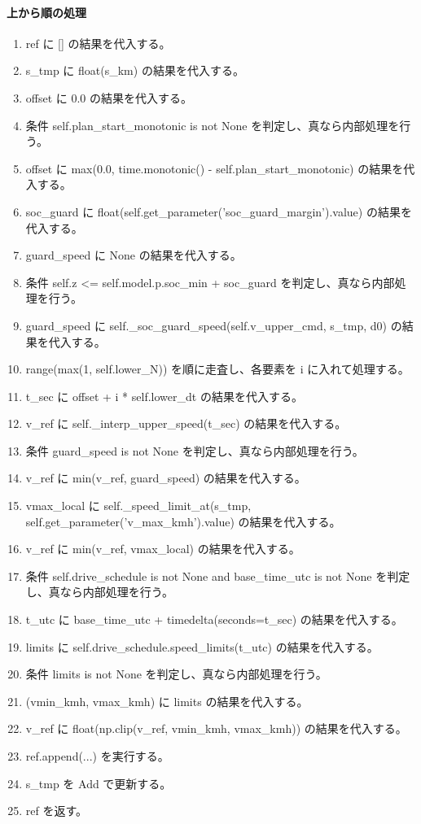 \documentclass[a4paper,11pt]{article}
\begin{document}
            \paragraph{上から順の処理}
            \begin{enumerate}[leftmargin=1.8em]
            \item ref に [] の結果を代入する。
\item s\_tmp に float(s\_km) の結果を代入する。
\item offset に 0.0 の結果を代入する。
\item 条件 self.plan\_start\_monotonic is not None を判定し、真なら内部処理を行う。
\item   offset に max(0.0, time.monotonic() - self.plan\_start\_monotonic) の結果を代入する。
\item soc\_guard に float(self.get\_parameter('soc\_guard\_margin').value) の結果を代入する。
\item guard\_speed に None の結果を代入する。
\item 条件 self.z <= self.model.p.soc\_min + soc\_guard を判定し、真なら内部処理を行う。
\item   guard\_speed に self.\_soc\_guard\_speed(self.v\_upper\_cmd, s\_tmp, d0) の結果を代入する。
\item range(max(1, self.lower\_N)) を順に走査し、各要素を i に入れて処理する。
\item   t\_sec に offset + i * self.lower\_dt の結果を代入する。
\item   v\_ref に self.\_interp\_upper\_speed(t\_sec) の結果を代入する。
\item   条件 guard\_speed is not None を判定し、真なら内部処理を行う。
\item     v\_ref に min(v\_ref, guard\_speed) の結果を代入する。
\item   vmax\_local に self.\_speed\_limit\_at(s\_tmp, self.get\_parameter('v\_max\_kmh').value) の結果を代入する。
\item   v\_ref に min(v\_ref, vmax\_local) の結果を代入する。
\item   条件 self.drive\_schedule is not None and base\_time\_utc is not None を判定し、真なら内部処理を行う。
\item     t\_utc に base\_time\_utc + timedelta(seconds=t\_sec) の結果を代入する。
\item     limits に self.drive\_schedule.speed\_limits(t\_utc) の結果を代入する。
\item     条件 limits is not None を判定し、真なら内部処理を行う。
\item       (vmin\_kmh, vmax\_kmh) に limits の結果を代入する。
\item       v\_ref に float(np.clip(v\_ref, vmin\_kmh, vmax\_kmh)) の結果を代入する。
\item   ref.append(...) を実行する。
\item   s\_tmp を Add で更新する。
\item ref を返す。
            \end{enumerate}
\end{document}
